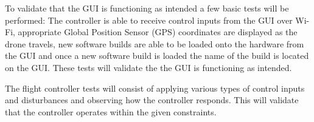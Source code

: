 To validate that the GUI is functioning as intended a few basic tests will be performed: The controller is able to receive control inputs from the GUI over Wi-Fi, appropriate Global Position Sensor (GPS) coordinates are displayed as the drone travels, new software builds are able to be loaded onto the hardware from the GUI and once a new software build is loaded the name of the build is located on the GUI. These tests will validate the the GUI is functioning as intended. 

The flight controller tests will consist of applying various types of control inputs and disturbances and observing how the controller responds. This will validate that the controller operates within the given constraints. 
